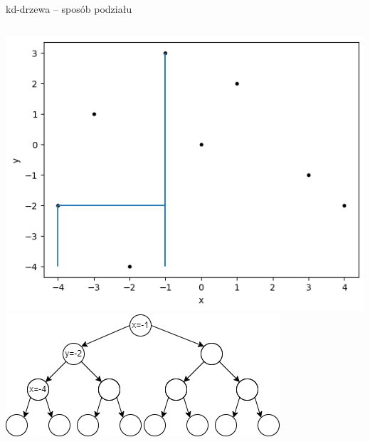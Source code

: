 \documentclass[aspectratio=169,dvipsnames]{beamer}
\begin{document}
\begin{frame}{kd-drzewa -- sposób podziału}
    \begin{columns}
        \includegraphics[width=\textwidth]{images/plots/4}
        \includegraphics[width=\textwidth]{images/trees/4.drawio}
    \end{columns}
\end{frame}
\end{document}
